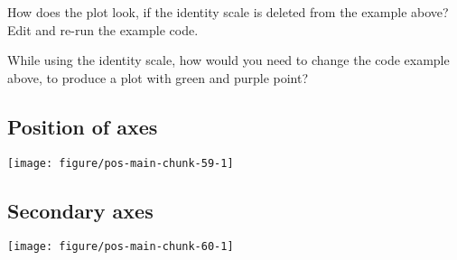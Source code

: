 \documentclass[krantz2]{krantz}\usepackage{knitr}%
\begin{document}
\begin{playground}
How does the plot look, if the identity scale is deleted from the example above? Edit and re-run the example code.
\end{playground}

\begin{playground}
While using the identity scale, how would you need to change the code example above, to produce a plot with green and purple point?
\end{playground}

\subsection{Position of axes}

\begin{knitrout}\footnotesize
{}\color{fgcolor}\begin{kframe}
\begin{alltt}
  \hlopt{+} \hlstd{()} \hlopt{+}
  \hlstd{(} \hlstd{=} \hlstd{)} \hlopt{+}
  \hlstd{(} \hlstd{=} \hlstd{)}
\end{alltt}
\end{kframe}

{\centering \texttt{[image: figure/pos-main-chunk-59-1]} 

}



\end{knitrout}

\subsection{Secondary axes}
\begin{knitrout}\footnotesize
{}\color{fgcolor}\begin{kframe}
\begin{alltt}
  \hlopt{+} \hlstd{()} \hlopt{+}
  \hlstd{(}
    \hlstd{,}
     \hlstd{=} \hlstd{(}\hlopt{~}  \hlopt{^-}\hlstd{,}  \hlstd{=} \hlstd{)}
  \hlstd{)}
\end{alltt}
\end{kframe}

{\centering \texttt{[image: figure/pos-main-chunk-60-1]} 

}



\end{knitrout}
\end{document}
